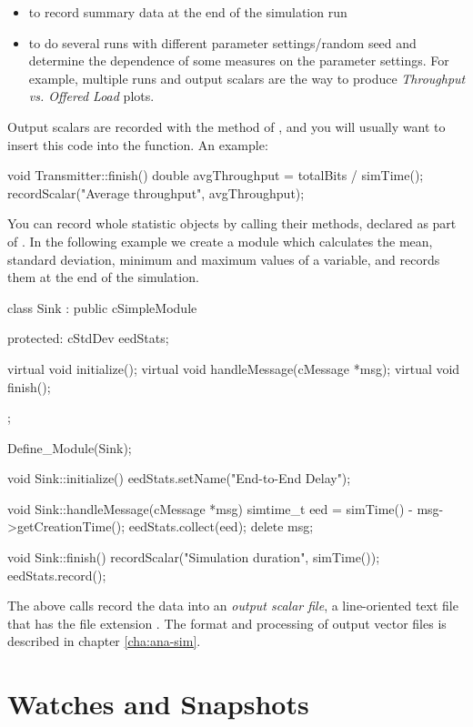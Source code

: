 \begin{itemize}
\item to record summary data at the end of the simulation run
\item to do several runs with different parameter settings/random seed
    and determine the dependence of some measures on the parameter
    settings. For example, multiple runs and output scalars are the
    way to produce \textit{Throughput vs. Offered Load} plots.
\end{itemize}

Output scalars are recorded with the  method of
, and you will usually want to insert this code
into the  function. An example:

\begin{cpp}
void Transmitter::finish()
{
    double avgThroughput = totalBits / simTime();
    recordScalar("Average throughput", avgThroughput);
}
\end{cpp}

You can record whole statistic objects by calling their 
methods, declared as part of . In the following example
we create a  module which calculates the mean, standard
deviation, minimum and maximum values of a variable, and records them at the
end of the simulation.

\begin{cpp}
class Sink : public cSimpleModule
{
  protected:
    cStdDev eedStats;

    virtual void initialize();
    virtual void handleMessage(cMessage *msg);
    virtual void finish();
};

Define_Module(Sink);

void Sink::initialize()
{
    eedStats.setName("End-to-End Delay");
}

void Sink::handleMessage(cMessage *msg)
{
    simtime_t eed = simTime() - msg->getCreationTime();
    eedStats.collect(eed);
    delete msg;
}

void Sink::finish()
{
    recordScalar("Simulation duration", simTime());
    eedStats.record();
}
\end{cpp}

The above calls record the data into an \textit{output scalar file},
a line-oriented text file that has the file extension .
The format and processing of output vector files is described in chapter
\ref{cha:ana-sim}.



\section{Watches and Snapshots}
\label{sec:sim-lib:watches-and-snapshots}

